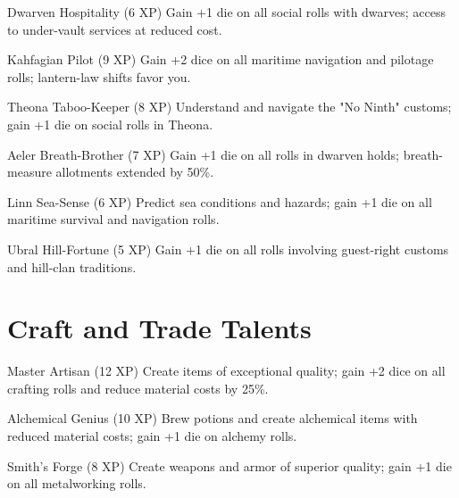 \documentclass[11pt]{article}
\begin{document}
\begin{talentbox}{Dwarven Hospitality (6 XP)}
Gain +1 die on all social rolls with dwarves; access to under-vault services at reduced cost.
\end{talentbox}

\begin{talentbox}{Kahfagian Pilot (9 XP)}
Gain +2 dice on all maritime navigation and pilotage rolls; lantern-law shifts favor you.
\end{talentbox}

\begin{talentbox}{Theona Taboo-Keeper (8 XP)}
Understand and navigate the "No Ninth" customs; gain +1 die on social rolls in Theona.
\end{talentbox}

\begin{talentbox}{Aeler Breath-Brother (7 XP)}
Gain +1 die on all rolls in dwarven holds; breath-measure allotments extended by 50\%.
\end{talentbox}

\begin{talentbox}{Linn Sea-Sense (6 XP)}
Predict sea conditions and hazards; gain +1 die on all maritime survival and navigation rolls.
\end{talentbox}

\begin{talentbox}{Ubral Hill-Fortune (5 XP)}
Gain +1 die on all rolls involving guest-right customs and hill-clan traditions.
\end{talentbox}

\section*{Craft and Trade Talents}

\begin{talentbox}{Master Artisan (12 XP)}
Create items of exceptional quality; gain +2 dice on all crafting rolls and reduce material costs by 25\%.
\end{talentbox}

\begin{talentbox}{Alchemical Genius (10 XP)}
Brew potions and create alchemical items with reduced material costs; gain +1 die on alchemy rolls.
\end{talentbox}

\begin{talentbox}{Smith's Forge (8 XP)}
Create weapons and armor of superior quality; gain +1 die on all metalworking rolls.
\end{talentbox}
\end{document}
